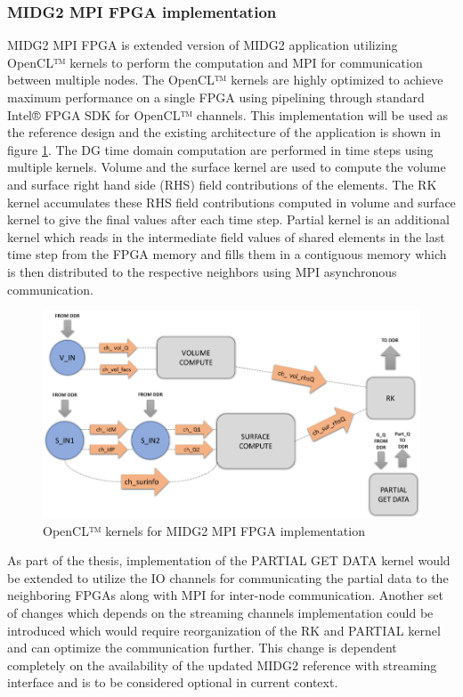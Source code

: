 \documentclass[english,notitlepage]{hgbreport}
\begin{document}
\subsubsection{MIDG2 MPI FPGA implementation}

MIDG2 MPI FPGA is extended version of MIDG2 application utilizing OpenCL™ kernels to perform the
computation and MPI for communication between multiple nodes. The OpenCL™ kernels are
highly optimized to achieve maximum performance on a single FPGA using pipelining through
standard Intel® FPGA SDK for OpenCL™ channels. This implementation will be used as the reference design and
the existing architecture of the application is shown in figure \ref{fig:kernels}.
The DG time domain computation are performed in time steps using multiple kernels.
Volume and the surface kernel are used to compute the volume and surface right hand side (RHS) field
contributions of the elements. The RK kernel accumulates these RHS
field contributions computed in volume and surface kernel to give the final values after each time step.
Partial kernel is an additional kernel which reads in the intermediate field values of shared elements in
the last time step from the FPGA memory and fills them in a contiguous memory which is then distributed
to the respective neighbors using MPI asynchronous communication.

\begin{figure}[h]%
    \centering
    \includegraphics[width=1.0\textwidth]{images/kernels}
    \caption{OpenCL™ kernels for MIDG2 MPI FPGA implementation}
    \label{fig:kernels}
\end{figure}

As part of the thesis, implementation of the PARTIAL GET DATA kernel would be extended to utilize the IO channels
for communicating the partial data to the neighboring FPGAs along with MPI for inter-node communication.
Another set of changes which depends on the streaming channels implementation could be introduced which
would require reorganization of the RK and PARTIAL kernel and can optimize the communication further.
This change is dependent completely on the availability of the updated MIDG2 reference with streaming
interface and is to be considered optional in current context. 
\end{document}
